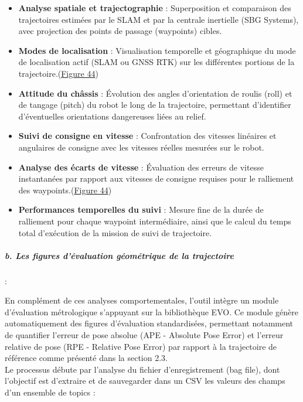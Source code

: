\begin{itemize}
\renewcommand{\labelitemi}{$\bullet$}
    \item \textbf{Analyse spatiale et trajectographie} : Superposition et comparaison des trajectoires estimées par le SLAM et par la centrale inertielle (SBG Systems), avec projection des points de passage (waypoints) cibles.
    \item \textbf{Modes de localisation} : Visualisation temporelle et géographique du mode de localisation actif (SLAM ou GNSS RTK) sur les différentes portions de la trajectoire.(\hyperref[fig44]{Figure 44})
    \item \textbf{Attitude du châssis} : Évolution des angles d'orientation de roulis (roll) et de tangage (pitch) du robot le long de la trajectoire, permettant d'identifier d'éventuelles orientations dangereuses liées au relief.
    \item \textbf{Suivi de consigne en vitesse} : Confrontation des vitesses linéaires et angulaires de consigne avec les vitesses réelles mesurées sur le robot.
    \item \textbf{Analyse des écarts de vitesse} : Évaluation des erreurs de vitesse instantanées par rapport aux vitesses de consigne requises pour le ralliement des waypoints.(\hyperref[fig44]{Figure 44})
    \item \textbf{Performances temporelles du suivi} : Mesure fine de la durée de ralliement pour chaque waypoint intermédiaire, ainsi que le calcul du temps total d'exécution de la mission de suivi de trajectoire.
\end{itemize}

\subparagraph{b. Les figures d'évaluation géométrique de la trajectoire}:

En complément de ces analyses comportementales, l'outil intègre un module d'évaluation métrologique s'appuyant sur la bibliothèque EVO. Ce module génère automatiquement des figures d'évaluation standardisées, permettant notamment de quantifier l'erreur de pose absolue (APE - Absolute Pose Error) et l'erreur relative de pose (RPE - Relative Pose Error) par rapport à la trajectoire de référence comme présenté dans la section 2.3.\\

\indent Le processus débute par l'analyse du fichier d'enregistrement (bag file), dont l'objectif est d'extraire et de sauvegarder dans un CSV les valeurs des champs d'un ensemble de topics : \\

